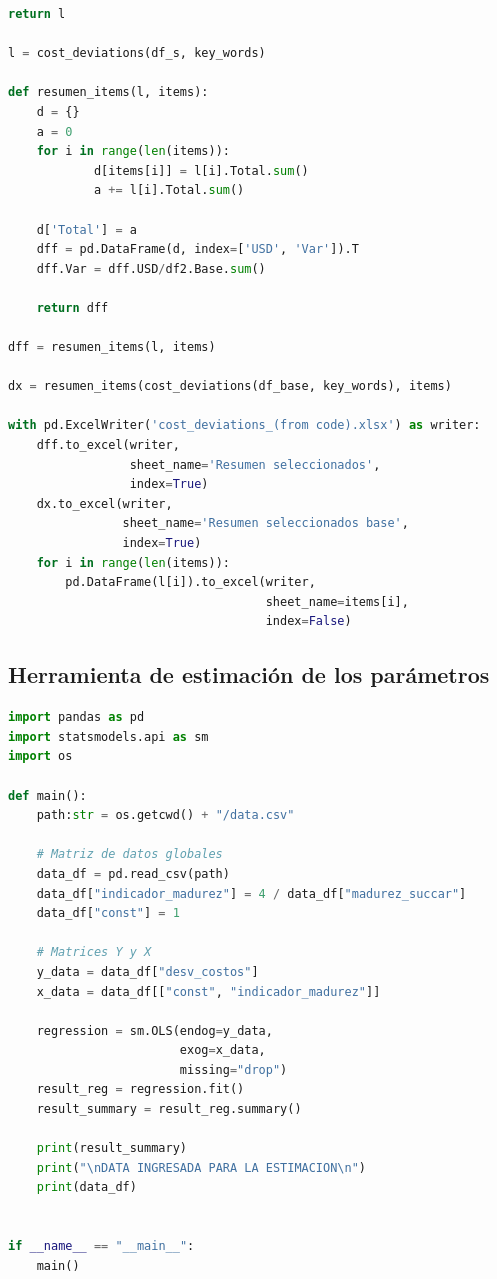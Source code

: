 \begin{lstlisting}[language=Python]
    return l

l = cost_deviations(df_s, key_words)

def resumen_items(l, items):
    d = {}
    a = 0 
    for i in range(len(items)):       
            d[items[i]] = l[i].Total.sum()
            a += l[i].Total.sum()
            
    d['Total'] = a
    dff = pd.DataFrame(d, index=['USD', 'Var']).T
    dff.Var = dff.USD/df2.Base.sum()

    return dff

dff = resumen_items(l, items)

dx = resumen_items(cost_deviations(df_base, key_words), items)

with pd.ExcelWriter('cost_deviations_(from code).xlsx') as writer:
    dff.to_excel(writer, 
                 sheet_name='Resumen seleccionados', 
                 index=True)
    dx.to_excel(writer, 
                sheet_name='Resumen seleccionados base', 
                index=True)
    for i in range(len(items)):
        pd.DataFrame(l[i]).to_excel(writer, 
                                    sheet_name=items[i], 
                                    index=False)
\end{lstlisting}

\subsection{Herramienta de estimación de los parámetros}

\begin{lstlisting}[language=Python]
import pandas as pd
import statsmodels.api as sm
import os

def main():
    path:str = os.getcwd() + "/data.csv"

    # Matriz de datos globales
    data_df = pd.read_csv(path)
    data_df["indicador_madurez"] = 4 / data_df["madurez_succar"]
    data_df["const"] = 1

    # Matrices Y y X
    y_data = data_df["desv_costos"]
    x_data = data_df[["const", "indicador_madurez"]]

    regression = sm.OLS(endog=y_data, 
                        exog=x_data,
                        missing="drop")
    result_reg = regression.fit()
    result_summary = result_reg.summary()

    print(result_summary)
    print("\nDATA INGRESADA PARA LA ESTIMACION\n")
    print(data_df)

    
if __name__ == "__main__":
    main()
\end{lstlisting}
